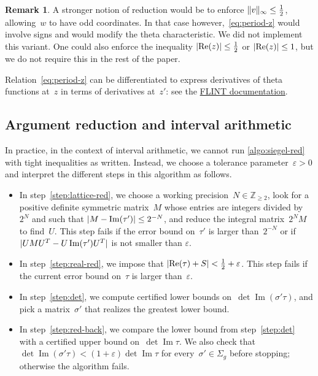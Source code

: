 \documentclass[12pt,oneside]{amsart}
\numberwithin{equation}{section}
\theoremstyle{definition}
\newtheorem{rem}[equation]{Remark}
\newcommand{\Z}{\mathbb{Z}}
\newcommand{\eps}{\varepsilon}
\DeclareMathOperator{\im}{Im}
\DeclareMathOperator{\re}{Re}
\DeclarePairedDelimiter{\abs}{|}{|}
\DeclarePairedDelimiter{\norm}{\|}{\|}
\begin{document}
\begin{rem}
  \label{rem:stronger-z-red}
  A stronger notion of reduction would be to enforce
  $\norm{v}_\infty \leq \frac12$, allowing~$w$ to have odd coordinates. In that
  case however,~\eqref{eq:period-z} would involve signs and would modify the
  theta characteristic. We did not implement this variant. One could also
  enforce the inequality $\abs{\re(z)}\leq \frac12$ or $\abs{\re(z)}\leq 1$,
  but we do not require this in the rest of the paper.

  Relation~\eqref{eq:period-z} can be differentiated to express derivatives of
  theta functions at~$z$ in terms of derivatives at~$z'$: see the
  \href{https://flintlib.org/doc/acb_theta.html#c.acb_theta_jet}{FLINT documentation}.

\end{rem}

\subsection{Argument reduction and interval arithmetic}
\label{subsec:inexact-reduction}

In practice, in the context of interval arithmetic, we cannot run
\cref{algo:siegel-red} with tight inequalities as written. Instead, we choose a
tolerance parameter~$\eps > 0$ and interpret the different steps in this
algorithm as follows.
\begin{itemize}
\item In step~\eqref{step:lattice-red}, we choose a working
  precision~$N\in \Z_{\geq 2}$, look for a positive definite symmetric
  matrix~$M$ whose entries are integers divided by~$2^N$ and such
  that $\abs{M - \im(\tau')} \leq 2^{-N}$, and reduce the integral
  matrix~$2^N M$ to find~$U$.  This step fails if the error bound
  on~$\tau'$ is larger than~$2^{-N}$ or if $\abs{U M U^T - U \im(\tau') U^T}$ is
  not smaller than $\eps$.
\item In step~\eqref{step:real-red}, we impose that
  $\abs{\re(\tau)+S}< \tfrac 12 + \eps$. This step fails if the current error
  bound on~$\tau$ is larger than~$\eps$.
\item In step~\eqref{step:det}, we compute certified lower bounds
  on~$\det\im(\sigma'\tau)$, and pick a matrix~$\sigma'$ that realizes the
  greatest lower bound.
\item In step~\eqref{step:red-back}, we compare the lower bound from
  step~\eqref{step:det} with a certified upper bound on~$\det\im\tau$. We also
  check that $\det \im(\sigma'\tau) < (1+\eps)\det\im\tau$ for
  every~$\sigma'\in \Sigma_g$ before stopping; otherwise the algorithm fails.
\end{itemize}
\end{document}
